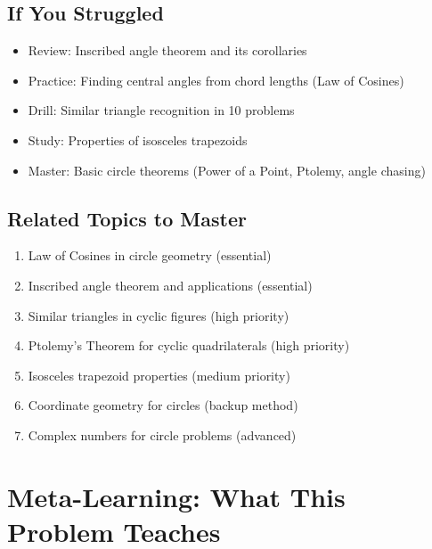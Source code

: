\documentclass[12pt]{article}
\begin{document}
\subsection*{If You Struggled}
\begin{itemize}[leftmargin=*]
    \item Review: Inscribed angle theorem and its corollaries
    \item Practice: Finding central angles from chord lengths (Law of Cosines)
    \item Drill: Similar triangle recognition in 10 problems
    \item Study: Properties of isosceles trapezoids
    \item Master: Basic circle theorems (Power of a Point, Ptolemy, angle chasing)
\end{itemize}

\subsection*{Related Topics to Master}
\begin{enumerate}[leftmargin=*]
    \item Law of Cosines in circle geometry (essential)
    \item Inscribed angle theorem and applications (essential)
    \item Similar triangles in cyclic figures (high priority)
    \item Ptolemy's Theorem for cyclic quadrilaterals (high priority)
    \item Isosceles trapezoid properties (medium priority)
    \item Coordinate geometry for circles (backup method)
    \item Complex numbers for circle problems (advanced)
\end{enumerate}

\section*{Meta-Learning: What This Problem Teaches}
\end{document}
